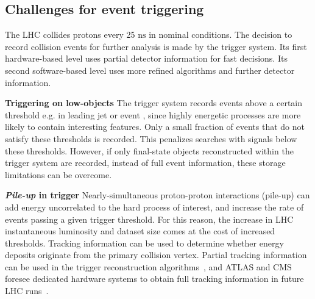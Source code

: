 

\begin{textbox}[!h]
\section{Challenges for event triggering}

The LHC collides protons every 25 $\mathrm{ns}$ in nominal conditions. %
The decision to record collision events for further analysis is made by the trigger system. 
Its first hardware-based level uses partial detector information for fast decisions.%
Its second software-based level uses more refined algorithms and further detector information.%

\textbf{Triggering on low-\pt objects}
The trigger system records events above a certain threshold e.g. in leading jet \pt or event \MET, since highly energetic processes are more likely to contain interesting features. 
Only a small fraction of events that do not satisfy these thresholds is recorded. 
This penalizes searches with signals below these thresholds. 
However, if only final-state objects reconstructed within the trigger system are recorded, instead of full event information, these storage limitations can be overcome. 

\textbf{\textit{Pile-up} in trigger} 
Nearly-simultaneous proton-proton interactions (pile-up) can add energy uncorrelated to the hard process of interest, and increase the rate of events passing a given trigger threshold. 
For this reason, the increase in LHC instantaneous luminosity and dataset size comes at the cost of increased thresholds.%
Tracking information can be used to determine whether energy deposits originate from the primary collision vertex. 
Partial tracking information can be used in the trigger reconstruction algorithms~\cite{CMS:2014ata,ATLAS-CONF-2014-019}, and ATLAS and CMS foresee dedicated hardware systems to obtain full tracking information in future LHC runs~\cite{Shochet:2013gaw,1748-0221-6-12-C12065}. 
 
\end{textbox}
